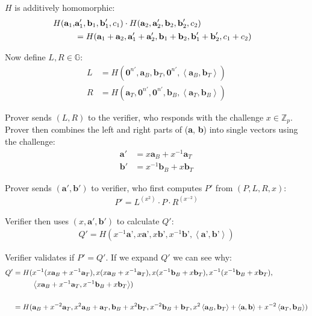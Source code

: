 \documentclass{article}
\begin{document}
$H$ is additively homomorphic:
\begin{align}
  H(\textbf{a}_1, & \textbf{a}'_1, \textbf{b}_1, \textbf{b}'_1, c_1) \cdot H(\textbf{a}_2, \textbf{a}'_2, \textbf{b}_2, \textbf{b}'_2, c_2)
  \cr &= H(\textbf{a}_1 + \textbf{a}_2, \textbf{a}'_1 + \textbf{a}'_2, \textbf{b}_1 + \textbf{b}_2, \textbf{b}'_1 + \textbf{b}'_2, c_1 + c_2)
\end{align}

Now define $L, R \in \mathbb{G}$:
\begin{align}
  L &= H(\textbf{0}^{n'}, \textbf{a}_{B}, \textbf{b}_{T}, \textbf{0}^{n'}, \left<\textbf{a}_{B}, \textbf{b}_{T}\right>)\\
  R &= H(\textbf{a}_{T}, \textbf{0}^{n'}, \textbf{0}^{n'}, \textbf{b}_{B}, \left<\textbf{a}_{T}, \textbf{b}_{B}\right>)
\end{align}

Prover sends $(L, R)$ to the verifier, who responds with the challenge $x \in \mathbb{Z}_p$.  Prover then combines the left and right parts of (\textbf{a}, \textbf{b}) into single vectors using the challenge:
\begin{align}
  \textbf{a}' &= x \textbf{a}_{B} + x^{-1} \textbf{a}_{T}\\
  \textbf{b}' &= x^{-1} \textbf{b}_{B} + x \textbf{b}_{T}
\end{align}

Prover sends $(\textbf{a}', \textbf{b}')$ to verifier, who first computes $P'$ from $(P, L, R, x)$:
\begin{align}
  P' = L^{(x^2)} \cdot P \cdot R^{(x^{-2})}
\end{align}

Verifier then uses $(x, \textbf{a}', \textbf{b}')$ to calculate $Q'$:
\begin{align}
  Q' = H(x^{-1} \textbf{a'}, x \textbf{a'}, x \textbf{b'}, x^{-1} \textbf{b'}, \left<\textbf{a'}, \textbf{b'}\right>)
\end{align}

Verifier validates if $P' = Q'$.  If we expand $Q'$ we can see why:
\begin{align}
  Q' = H(&x^{-1}(x \textbf{a}_{B} + x^{-1} \textbf{a}_{T}), x(x \textbf{a}_{B} + x^{-1} \textbf{a}_{T}),
         x(x^{-1} \textbf{b}_{B} + x \textbf{b}_{T}), x^{-1}(x^{-1} \textbf{b}_{B} + x \textbf{b}_{T}),\nonumber\\
         &\left<x \textbf{a}_{B} + x^{-1} \textbf{a}_{T}, x^{-1} \textbf{b}_{B} + x \textbf{b}_{T}\right>)\nonumber\\
  \cr = H(&\textbf{a}_{B} + x^{-2} \textbf{a}_{T}, x^2 \textbf{a}_{B} + \textbf{a}_{T},
          \textbf{b}_{B} + x^2 \textbf{b}_{T}, x^{-2} \textbf{b}_{B} + \textbf{b}_{T},
          x^2 \left<\textbf{a}_{B}, \textbf{b}_{T}\right> + \left<\textbf{a}, \textbf{b}\right> + x^{-2} \left<\textbf{a}_{T}, \textbf{b}_{B}\right>)
\end{align}
\end{document}
